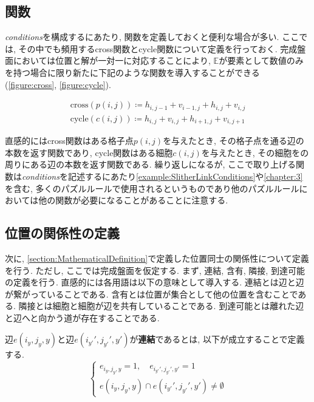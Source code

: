 \subsection{関数}\label{subsection:Function}
\textit{conditions}を構成するにあたり, 関数を定義しておくと便利な場合が多い. ここでは, その中でも頻用するcross関数とcycle関数について定義を行っておく.
完成盤面においては位置と解が一対一に対応することにより, $\mathbb{E}$が要素として数値のみを持つ場合に限り新たに下記のような関数を導入することができる(\cref{figure:cross}, \cref{figure:cycle}).

\begin{definition}\label{definition:Function}
  \begin{align}
    \text{cross}(p(i,j))\coloneqq h_{i,j-1}+v_{i-1,j}+h_{i,j}+v_{i,j} \\
    \text{cycle}(c(i,j))\coloneqq h_{i,j}+v_{i,j}+h_{i+1,j}+v_{i,j+1}
  \end{align}
\end{definition}

直感的にはcross関数はある格子点$p(i,j)$を与えたとき, その格子点を通る辺の本数を返す関数であり, cycle関数はある細胞$c(i,j)$を与えたとき, その細胞をの周りにある辺の本数を返す関数である.
繰り返しになるが, ここで取り上げる関数は\textit{conditions}を記述するにあたり\cref{example:SlitherLinkConditions}や\cref{chapter:3}を含む, 多くのパズルルールで使用されるというものであり他のパズルルールにおいては他の関数が必要になることがあることに注意する.

\subsection{位置の関係性の定義}\label{subsection:RelationDefinition}

次に, \cref{section:MathematicalDefinition}で定義した位置同士の関係性について定義を行う. ただし, ここでは完成盤面を仮定する.
まず, 連結, 含有, 隣接, 到達可能の定義を行う.
直感的には各用語は以下の意味として導入する.
連結とは辺と辺が繋がっていることである.
含有とは位置が集合として他の位置を含むことである.
隣接とは細胞と細胞が辺を共有していることである.
到達可能とは離れた辺と辺へと向かう道が存在することである.

\begin{definition}[連結]\label{definition:Connection}
  辺$e(i_y,j_y,y)$と辺$e(i_{y'}',j_{y'}',y')$が\textbf{連結}であるとは, 以下が成立することで定義する.
  \begin{equation}
    \begin{cases}
      {e_{i_y,j_y,y}=1,\quad e_{i_{y'}',j_{y'}',y'}  =     1          } \\
      {e(i_y,j_y,y)\cap e(i_{y'}',j_{y'}',y')  \neq  \emptyset}
    \end{cases}
  \end{equation}
\end{definition}

